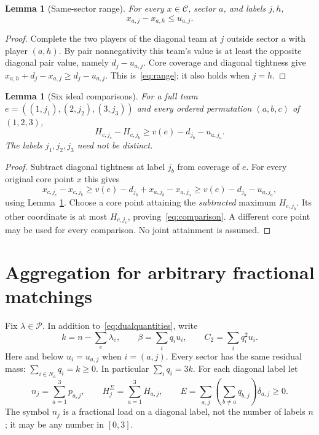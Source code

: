 \documentclass[11pt]{article}
\newtheorem{lemma}[theorem]{Lemma}
\theoremstyle{remark}
\newcommand{\core}{\mathcal C}
\newcommand{\pack}{\mathcal P}
\begin{document}
\begin{lemma}[Same-sector range]\label{lem:range}
For every $x\in\core$, sector $a$, and labels $j,h$,
\begin{equation}\label{eq:range}
                         x_{a,j}-x_{a,h}\le u_{a,j}.
\end{equation}
\end{lemma}
\begin{proof}
Complete the two players of the diagonal team at $j$ outside sector $a$
with player $(a,h)$. By pair nonnegativity this team's value is at least
the opposite diagonal pair value, namely $d_j-u_{a,j}$.
Core coverage and diagonal tightness give
$x_{a,h}+d_j-x_{a,j}\ge d_j-u_{a,j}$.
This is~\eqref{eq:range}; it also holds when $j=h$.
\end{proof}

\begin{lemma}[Six ideal comparisons]\label{lem:comparison}
For a full team $e=((1,j_1),(2,j_2),(3,j_3))$ and every ordered
permutation $(a,b,c)$ of $(1,2,3)$,
\begin{equation}\label{eq:comparison}
         H_{c,j_c}-H_{c,j_b}\ge v(e)-d_{j_b}-u_{a,j_a}.
\end{equation}
The labels $j_1,j_2,j_3$ need not be distinct.
\end{lemma}
\begin{proof}
Subtract diagonal tightness at label $j_b$ from coverage of $e$.
For every original core point $x$ this gives
\[
 x_{c,j_c}-x_{c,j_b}
 \ge v(e)-d_{j_b}+x_{a,j_b}-x_{a,j_a}
 \ge v(e)-d_{j_b}-u_{a,j_a},
\]
using Lemma~\ref{lem:range}. Choose a core point attaining the
\emph{subtracted} maximum $H_{c,j_b}$. Its other coordinate is at most
$H_{c,j_c}$, proving~\eqref{eq:comparison}. A different core point may
be used for every comparison. No joint attainment is assumed.
\end{proof}

\section{Aggregation for arbitrary fractional matchings}\label{sec:aggregation}
Fix $\lambda\in\pack$. In addition to~\eqref{eq:dualquantities}, write
\begin{equation}\label{eq:residual}
 k=n-\sum_e\lambda_e,\qquad
 \beta=\sum_iq_iu_i,\qquad C_2=\sum_iq_i^2u_i.
\end{equation}
Here and below $u_i=u_{a,j}$ when $i=(a,j)$. Every sector has the same
residual mass: $\sum_{i\in N_a}q_i=k\ge0$. In particular $\sum_iq_i=3k$.
For each diagonal label let
\[
 n_j=\sum_{a=1}^3p_{a,j},\qquad H_j^\Sigma=\sum_{a=1}^3H_{a,j},\qquad
 E=\sum_{a,j}\left(\sum_{b\ne a}q_{b,j}\right)\delta_{a,j}\ge0.
\]
The symbol $n_j$ is a fractional load on a diagonal label, not the number
of labels $n$; it may be any number in $[0,3]$.
\end{document}
